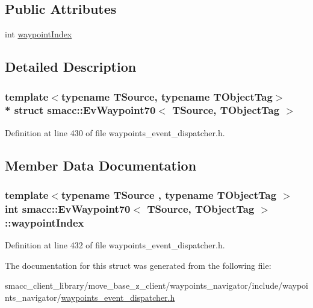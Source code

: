 \subsection*{Public Attributes}
\begin{DoxyCompactItemize}
\item 
int \hyperlink{structsmacc_1_1EvWaypoint70_a9851267d460680f707988aee92a6f9db}{waypoint\+Index}
\end{DoxyCompactItemize}


\subsection{Detailed Description}
\subsubsection*{template$<$typename T\+Source, typename T\+Object\+Tag$>$\\*
struct smacc\+::\+Ev\+Waypoint70$<$ T\+Source, T\+Object\+Tag $>$}



Definition at line 430 of file waypoints\+\_\+event\+\_\+dispatcher.\+h.



\subsection{Member Data Documentation}
\subsubsection[{\texorpdfstring{waypoint\+Index}{waypointIndex}}]{\setlength{\rightskip}{0pt plus 5cm}template$<$typename T\+Source , typename T\+Object\+Tag $>$ int {\bf smacc\+::\+Ev\+Waypoint70}$<$ T\+Source, T\+Object\+Tag $>$\+::waypoint\+Index}\hypertarget{structsmacc_1_1EvWaypoint70_a9851267d460680f707988aee92a6f9db}{}\label{structsmacc_1_1EvWaypoint70_a9851267d460680f707988aee92a6f9db}


Definition at line 432 of file waypoints\+\_\+event\+\_\+dispatcher.\+h.



The documentation for this struct was generated from the following file\+:\begin{DoxyCompactItemize}
\item 
smacc\+\_\+client\+\_\+library/move\+\_\+base\+\_\+z\+\_\+client/waypoints\+\_\+navigator/include/waypoints\+\_\+navigator/\hyperlink{waypoints__event__dispatcher_8h}{waypoints\+\_\+event\+\_\+dispatcher.\+h}\end{DoxyCompactItemize}
